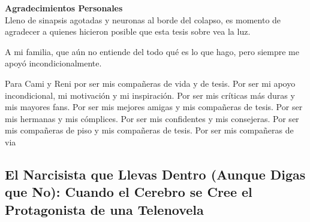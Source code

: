\documentclass[
]{article}
\renewcommand*\contentsname{Table of contents}
\newcommand\contentsname{Table of contents}
\begin{document}
\newpage
    \begin{center}
        {\large \textbf{Agradecimientos Personales}}\\[0.3cm]
        Lleno de sinapsis agotadas y neuronas al borde del colapso, es momento de agradecer a quienes hicieron posible que esta tesis sobre vea la luz.

        A mi familia, que aún no entiende del todo qué es lo que hago, pero siempre me apoyó incondicionalmente. 

    \end{center}

\newpage
    \begin{center}
        Para Cami y Reni por ser mis compañeras de vida y de tesis. Por ser mi apoyo incondicional, mi motivación y mi inspiración. Por ser mis críticas más duras y mis mayores fans. Por ser mis mejores amigas y mis compañeras de tesis. Por ser mis hermanas y mis cómplices. Por ser mis confidentes y mis consejeras. Por ser mis compañeras de piso y mis compañeras de tesis. Por ser mis compañeras de via
    \end{center}

\newpage
\begin{center}
\end{center}

\newpage



\newpage
\tableofcontents



\renewcommand*\contentsname{Table of contents}
{
\hypersetup{linkcolor=}
\setcounter{tocdepth}{3}
\tableofcontents
}
\subsection{El Narcisista que Llevas Dentro (Aunque Digas que No):
Cuando el Cerebro se Cree el Protagonista de una
Telenovela}\label{el-narcisista-que-llevas-dentro-aunque-digas-que-no-cuando-el-cerebro-se-cree-el-protagonista-de-una-telenovela}
\end{document}
